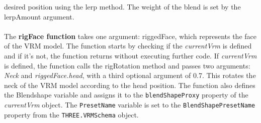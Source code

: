 desired position using the lerp method. The weight of the blend is set by the lerpAmount argument.
\\
\\
The \textbf{rigFace function} takes one argument: riggedFace, which represents the face of the VRM model. The function starts 
by checking if the \emph{currentVrm} is defined and if it's not, the function returns without executing further code.
If \emph{currentVrm} is defined, the function calls the rigRotation method and passes two arguments: \emph{Neck} and \emph{riggedFace.head}, 
with a third optional argument of 0.7. This rotates the neck of the VRM model according to the head position.
The function also defines the Blendshape variable and assigns it to the \texttt{blendShapeProxy} property of the \emph{currentVrm} object. 
The \texttt{PresetName} variable is set to the \texttt{BlendShapePresetName} property from the \texttt{THREE.VRMSchema} object.
\\
\\
